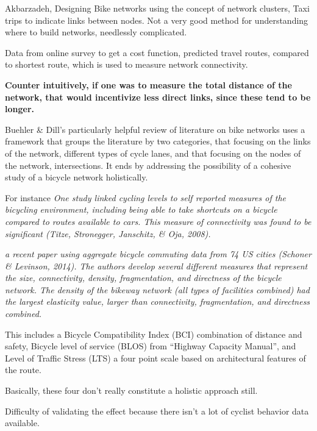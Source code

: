 \documentclass[11pt]{article} %
\begin{document}
Akbarzadeh, Designing Bike networks using the concept of network clusters, Taxi trips to indicate links between nodes. Not a very good method for understanding where to build networks, needlessly complicated. \cite{akbarzadeh2018designing}


Data from online survey to get a cost function, predicted travel routes, compared to shortest route, which is used to measure network connectivity. 

\textbf{
Counter intuitively, if one was to measure the total distance of the network, that would incentivize less direct links, since these tend to be longer.}  
\cite{boisjoly2019bicycle} 



Buehler \& Dill's  particularly helpful review of literature on bike networks uses a framework that groups the literature by two categories, that focusing on the links of the network, different types of cycle lanes, and that focusing on the nodes of the network, intersections. It ends by addressing the possibility of a cohesive study of a bicycle network holistically.

	For instance \textit{One study linked cycling levels to self reported measures of the bicycling environment, including being able to take shortcuts on a bicycle compared to routes available to cars. This measure of connectivity was found to be significant (Titze, Stronegger, Janschitz, \& Oja, 2008).}
	
	\textit{ a recent paper using aggregate bicycle commuting data from 74 US cities (Schoner \& Levinson, 2014). The authors develop several different measures that represent the size, connectivity, density, fragmentation, and directness of the bicycle network. The density of the bikeway network (all types of facilities combined) had the largest elasticity value, larger than connectivity, fragmentation, and directness combined.}
	
	This includes a Bicycle Compatibility Index (BCI) combination of distance and safety, Bicycle level of service (BLOS) from ``Highway Capacity Manual'', \cite{Lowry} and Level of Traffic Stress (LTS) \cite{Mekuria and Furth} a four point scale based on architectural features of the route.
	
	Basically, these four don't really constitute a holistic approach still. 
	
	Difficulty of validating the effect because there isn't a lot of cyclist behavior data available.
	
\end{document}
